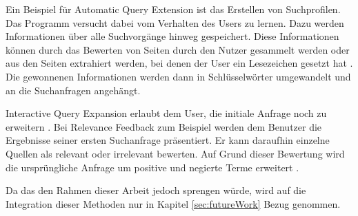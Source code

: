  Ein Beispiel für Automatic Query Extension ist das Erstellen von Suchprofilen. Das Programm versucht dabei vom Verhalten des Users zu lernen. Dazu werden Informationen über alle Suchvorgänge hinweg gespeichert. Diese Informationen können durch das Bewerten von Seiten durch den Nutzer gesammelt werden oder aus den Seiten extrahiert werden, bei denen der User ein Lesezeichen gesetzt hat \cite{budzik2000user}. Die gewonnenen Informationen werden dann in Schlüsselwörter umgewandelt und an die Suchanfragen angehängt.

 Interactive Query Expansion erlaubt dem User, die initiale Anfrage noch zu erweitern \cite{harman1988towards}. Bei Relevance Feedback zum Beispiel werden dem Benutzer die Ergebnisse seiner ersten Suchanfrage präsentiert. Er kann daraufhin einzelne Quellen als relevant oder irrelevant bewerten. Auf Grund dieser Bewertung wird die ursprüngliche Anfrage um positive und negierte Terme erweitert \cite{budzik2000user}.

 Da das den Rahmen dieser Arbeit jedoch sprengen würde, wird auf die Integration dieser Methoden nur in Kapitel \ref{sec:futureWork} Bezug genommen.